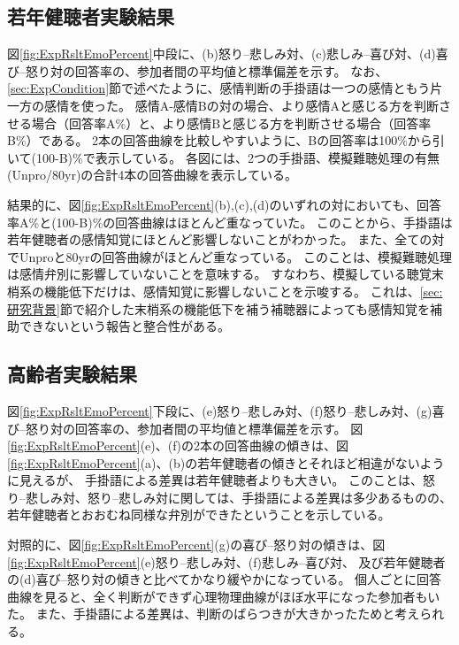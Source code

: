 \subsection{若年健聴者実験結果}
図\ref{fig:ExpRsltEmoPercent}中段に、(b)怒り--悲しみ対、(c)悲しみ--喜び対、(d)喜び--怒り対の回答率の、参加者間の平均値と標準偏差を示す。
なお、\ref{sec:ExpCondition}節で述べたように、感情判断の手掛語は一つの感情ともう片一方の感情を使った。
感情A-感情Bの対の場合、より感情Aと感じる方を判断させる場合（回答率A\%）と、より感情Bと感じる方を判断させる場合（回答率B\%）である。
2本の回答曲線を比較しやすいように、Bの回答率は100\%から引いて(100-B)\%で表示している。
各図には、2つの手掛語、模擬難聴処理の有無(Unpro/80yr)の合計4本の回答曲線を表示している。

結果的に、図\ref{fig:ExpRsltEmoPercent}(b),(c),(d)のいずれの対においても、回答率A\%と(100-B)\%の回答曲線はほとんど重なっていた。
このことから、手掛語は若年健聴者の感情知覚にほとんど影響しないことがわかった。
また、全ての対でUnproと80yrの回答曲線がほとんど重なっている。
このことは、模擬難聴処理は感情弁別に影響していないことを意味する。
すなわち、模擬している聴覚末梢系の機能低下だけは、感情知覚に影響しないことを示唆する。
これは、\ref{sec:研究背景}節で紹介した末梢系の機能低下を補う補聴器によっても感情知覚を補助できないという報告\cite{goy2018hearing}と整合性がある。


\subsection{高齢者実験結果}
図\ref{fig:ExpRsltEmoPercent}下段に、(e)怒り--悲しみ対、(f)怒り--悲しみ対、(g)喜び--怒り対の回答率の、参加者間の平均値と標準偏差を示す。
図\ref{fig:ExpRsltEmoPercent}(e)、(f)の2本の回答曲線の傾きは、図\ref{fig:ExpRsltEmoPercent}(a)、(b)の若年健聴者の傾きとそれほど相違がないように見えるが、
手掛語による差異は若年健聴者よりも大きい。
このことは、怒り--悲しみ対、怒り--悲しみ対に関しては、手掛語による差異は多少あるものの、若年健聴者とおおむね同様な弁別ができたということを示している。

対照的に、図\ref{fig:ExpRsltEmoPercent}(g)の喜び--怒り対の傾きは、図\ref{fig:ExpRsltEmoPercent}(e)怒り--悲しみ対、(f)悲しみ--喜び対、
及び若年健聴者の(d)喜び--怒り対の傾きと比べてかなり緩やかになっている。
個人ごとに回答曲線を見ると、全く判断ができず心理物理曲線がほぼ水平になった参加者もいた。
また、手掛語による差異は、判断のばらつきが大きかったためと考えられる。


